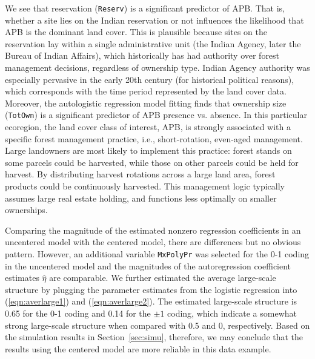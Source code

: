 \documentclass[authoryear,review, 12pt]{elsarticle}
\begin{document}
We see that reservation ({\tt Reserv}) is a significant predictor of APB. That is, whether a site lies on the Indian reservation or not influences the likelihood that APB is the dominant land cover. This is plausible because sites on the reservation lay within a single administrative unit (the Indian Agency, later the Bureau of Indian Affairs), which historically has had authority over forest management decisions, regardless of ownership type. Indian Agency authority was especially pervasive in the early 20th century (for historical political reasons), which corresponds with the time period represented by the land cover data. Moreover, the autologistic regression model fitting finds that ownership size ({\tt TotOwn}) is a significant predictor of APB presence vs. absence. In this particular ecoregion, the land cover class of interest, APB, is strongly associated with a specific forest management practice, i.e., short-rotation, even-aged management. Large landowners are most likely to implement this practice: forest stands on some parcels could be harvested, while those on other parcels could be held for harvest. By distributing harvest rotations across a large land area, forest products could be continuously harvested. This management logic typically assumes large real estate holding, and functions less optimally on smaller ownerships. 

Comparing the magnitude of the estimated nonzero regression coefficients in an uncentered model with the centered model, there are differences but no obvious pattern. However, an additional variable {\tt MxPolyPr} was selected for the 0-1 coding in the uncentered model and the magnitudes of the autoregression coefficient estimates $\widehat\eta$ are comparable.  We further estimated the average large-scale structure by plugging the parameter estimates from the logistic regression into (\ref{eqn:averlarge1}) and (\ref{eqn:averlarge2}). The estimated large-scale structure is 0.65 for the 0-1 coding and 0.14 for the $\pm 1$ coding, which indicate a somewhat strong large-scale structure when compared with 0.5 and 0, respectively.  Based on the simulation results in Section~\ref{sec:simu}, therefore, we may conclude that the results using the centered model are more reliable in this data example.
\end{document}
